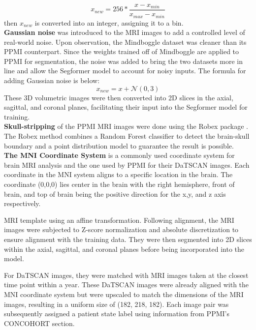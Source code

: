 \begin{equation}
 x_{new} = 256 * \frac{x-x_{min}}{x_{max}-x_{min}}
\end{equation}
then $x_{new}$ is converted into an integer, assigning it to a bin.\\
\textbf{Gaussian noise} was introduced to the MRI images to add a controlled level of real-world noise. Upon observation, the Mindboggle dataset was cleaner than its PPMI counterpart. Since the weights trained off of Mindboggle are applied to PPMI for segmentation, the noise was added to bring the two datasets more in line and allow the Segformer model to account for noisy inputs. The formula for adding Gaussian noise is below:
\begin{equation}
 x_{new} = x + \mathcal{N}(0,3)
\end{equation}
These 3D volumetric images were then converted into 2D slices in the axial, sagittal, and coronal planes, facilitating their input into the Segformer model for training.\\
\textbf{Skull-stripping} of the PPMI MRI images were done using the Robex package \cite{iglesias2011robust}. The Robex method combines a Random Forest classifier to detect the brain-skull boundary and a point distribution model to guarantee the result is possible.\\
\textbf{The MNI Coordinate System} is a commonly used coordinate system for brain MRI analysis and the one used by PPMI for their DaTSCAN images. Each coordinate in the MNI system aligns to a specific location in the brain. The coordinate (0,0,0) lies center in the brain with the right hemisphere, front of brain, and top of brain being the positive direction for the x,y, and z axis respectively. 


MRI template using an affine transformation. Following alignment, the MRI images were subjected to Z-score normalization and absolute discretization to ensure alignment with the training data. They were then segmented into 2D slices within the axial, sagittal, and coronal planes before being incorporated into the model.

For DaTSCAN images, they were matched with MRI images taken at the closest time point within a year. These DaTSCAN images were already aligned with the MNI coordinate system but were upscaled to match the dimensions of the MRI images, resulting in a uniform size of (182, 218, 182). Each image pair was subsequently assigned a patient state label using information from PPMI's CONCOHORT section.
